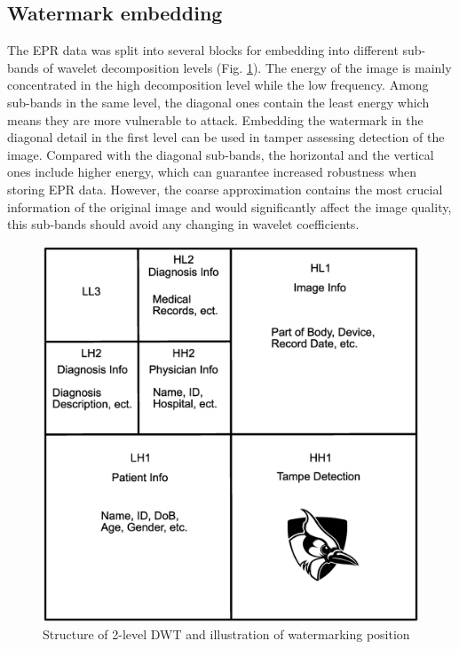 \documentclass[letterpaper, 10 pt, conference]{ieeeconf}  %
\begin{document}
\subsection{Watermark embedding}
The EPR data was split into several blocks for embedding into different sub-bands of wavelet decomposition levels  (Fig. \ref{WMPos}). The energy of the image is mainly concentrated in the high decomposition level while the low frequency. Among sub-bands in the same level, the diagonal ones contain the least energy which means they are more vulnerable to attack. Embedding the watermark in the diagonal detail in the first level can be used in tamper assessing detection of the image. Compared with the diagonal sub-bands, the horizontal and the vertical ones include higher energy, which can guarantee increased robustness when storing EPR data. However, the coarse approximation contains the most crucial information of the original image and would significantly affect the image quality, this sub-bands should avoid any changing in wavelet coefficients.
\begin{figure}[htbp]
	\centering
	\includegraphics[width=1\linewidth]{WMPos}
	\caption{Structure of 2-level DWT and illustration of watermarking position}
	\label{WMPos}
\end{figure}
\end{document}
